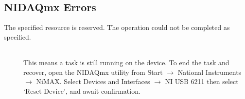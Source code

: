 \documentclass[10pt,a4paper]{article}
\begin{document}
\subsection{NIDAQmx Errors}
\begin{description}
\item[The specified resource is reserved. The operation could not be completed as specified.] \hfill \\
This means a task is still running on the device. To end the task and recover, open the NIDAQmx utility from Start $\rightarrow$ National Instruments $\rightarrow$ NiMAX. Select Devices and Interfaces $\rightarrow$ NI USB 6211 then select `Reset Device', and await confirmation.
\end{description}
\end{document}
